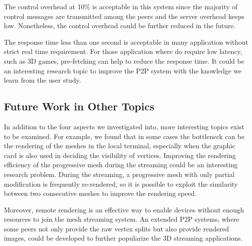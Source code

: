 \documentclass[11pt, a4paper]{report}
\begin{document}
The control overhead at 10\% is acceptable in this system since the majority of
control messages are transmitted among the peers and the server overhead keeps low. 
Nonetheless, the control overhead could be further reduced in the future. 

The response time less than one second is acceptable in many application without 
strict real time requirement. For those application where do require low latency, such
as 3D games, pre-fetching can help to reduce the response time. It could be an interesting 
research topic to improve the P2P system with the knowledge we learn from the user study.

\subsection{Future Work in Other Topics}
In addition to the four aspects we investigated into, more interesting topics exist to be examined.
For example, we found that in some cases the bottleneck can be the rendering of the meshes in the local 
terminal, especially when the graphic card is also used in deciding the visibility of vertices. 
Improving the rendering efficiency of the progressive mesh during the streaming 
could be an interesting research problem.  
During the streaming, a progressive mesh with only partial modification is frequently re-rendered, 
so it is possible to exploit the similarity between two consecutive meshes to improve the rendering speed.

Moreover, remote rendering is an effective way to enable devices without enough resources to 
join the mesh streaming system. An extended P2P systems, where some peers not only provide the raw vertex splits
but also provide rendered images, could be developed to further popularize the 3D streaming applications.


\end{document}
